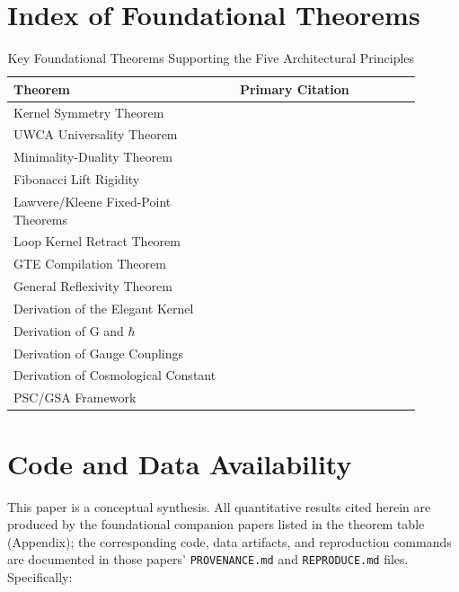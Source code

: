 \documentclass[12pt]{article}
\begin{document}
\section{Index of Foundational Theorems}
\label{app:theorems}
\begin{table}[h!]
\centering
\caption{Key Foundational Theorems Supporting the Five Architectural Principles}
\begin{tabular}{p{0.5\linewidth} p{0.4\linewidth}}
\toprule
\textbf{Theorem} & \textbf{Primary Citation} \\
\midrule
Kernel Symmetry Theorem & \cite{Spivack2025UGP} \\
UWCA Universality Theorem & \cite{Spivack2025UGP} \\
Minimality-Duality Theorem & \cite{Spivack2025UGP} \\
Fibonacci Lift Rigidity & \cite{Spivack2025UGP} \\
Lawvere/Kleene Fixed-Point Theorems & \cite{Spivack2025UGP} \\
Loop Kernel Retract Theorem & \cite{Spivack2025UGP} \\
GTE Compilation Theorem & \cite{Spivack2025UGP} \\
General Reflexivity Theorem & \cite{Spivack2025UGP} \\
Derivation of the Elegant Kernel & \cite{Spivack2025_UGPMathFoundations} \\
Derivation of G and $\hbar$ & \cite{Spivack2025UGP} \\
Derivation of Gauge Couplings & \cite{Spivack2025_UGPMathFoundations} \\
Derivation of Cosmological Constant & \cite{SpivackUGPFormalization} \\
PSC/GSA Framework & \cite{SpivackUGPSurvey} \\
\bottomrule
\end{tabular}
\end{table}

\section*{Code and Data Availability}

This paper is a conceptual synthesis. All quantitative results cited herein are produced by the foundational companion papers listed in the theorem table (Appendix); the corresponding code, data artifacts, and reproduction commands are documented in those papers' \texttt{PROVENANCE.md} and \texttt{REPRODUCE.md} files. Specifically:
\end{document}
